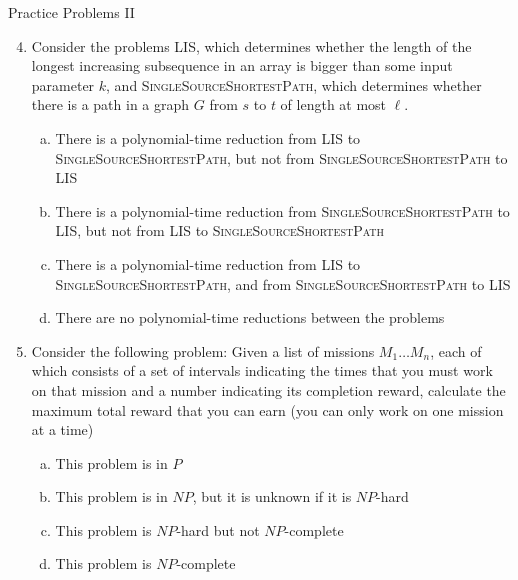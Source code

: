 \documentclass{beamer}
\begin{document}
\begin{frame}[t]{Practice Problems II}
    \begin{enumerate}
        \setcounter{enumi}{3}
        \item Consider the problems \textsc{LIS}, which determines whether the length of the longest increasing subsequence in an array is bigger than some input parameter $k$, and \textsc{SingleSourceShortestPath}, which determines whether there is a path in a graph $G$ from $s$ to $t$ of length at most $\ell$.
        \begin{enumerate}[(a)]
            \item There is a polynomial-time reduction from \textsc{LIS} to \textsc{SingleSourceShortestPath}, but not from \textsc{SingleSourceShortestPath} to \textsc{LIS}
            \item There is a polynomial-time reduction from \textsc{SingleSourceShortestPath} to \textsc{LIS}, but not from \textsc{LIS} to \textsc{SingleSourceShortestPath}
            \item There is a polynomial-time reduction from \textsc{LIS} to \textsc{SingleSourceShortestPath}, and from \textsc{SingleSourceShortestPath} to \textsc{LIS}
            \item There are no polynomial-time reductions between the problems
        \end{enumerate}
        \pause\item Consider the following problem: Given a list of missions $M_1 \dotsc M_n$, each of which consists of a set of intervals indicating the times that you must work on that mission and a number indicating its completion reward, calculate the maximum total reward that you can earn (you can only work on one mission at a time)
        \begin{enumerate}[(a)]
            \item This problem is in $P$
            \item This problem is in $NP$, but it is unknown if it is $NP$-hard
            \item This problem is $NP$-hard but not $NP$-complete
            \item This problem is $NP$-complete
        \end{enumerate}
    \end{enumerate}
\end{frame}
\end{document}
